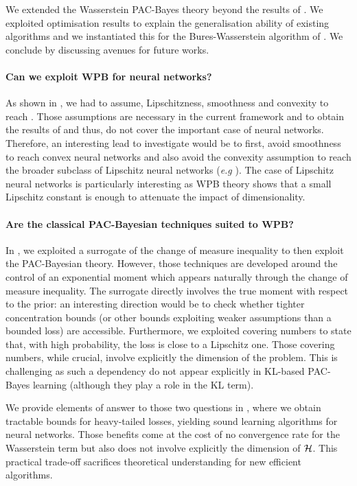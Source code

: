 We extended the Wasserstein PAC-Bayes theory beyond the results of \citet{amit2022integral}. We exploited optimisation results to explain the generalisation ability of existing algorithms and we instantiated this for the Bures-Wasserstein algorithm of \citet{lambert2022variational}. We conclude by discussing avenues for future works.

\paragraph{Can we exploit WPB for neural networks?} As shown in , we had to assume, Lipschitzness, smoothness and convexity to reach . Those assumptions are necessary in the current framework and to obtain the results of \citet{lambert2022variational} and thus, do not cover the important case of neural networks.
Therefore, an interesting lead to investigate would be to first, avoid smoothness to reach convex neural networks \citet{bengio2005convex} and also avoid the convexity assumption to reach the broader subclass of Lipschitz neural networks (\emph{e.g} \citealp{gouk2021regularisation}).
The case of Lipschitz neural networks is particularly interesting as WPB theory shows that a small Lipschitz constant is enough to attenuate the impact of dimensionality. 

\paragraph{Are the classical PAC-Bayesian techniques suited to WPB?} In , we exploited a surrogate of the change of measure inequality to then exploit the PAC-Bayesian theory. However, those techniques are developed around the control of an exponential moment which appears naturally through the change of measure inequality. The surrogate directly involves the true moment with respect to the prior: an interesting direction would be to check whether tighter concentration bounds (or other bounds exploiting weaker assumptions than a bounded loss) are accessible. Furthermore, we exploited covering numbers to state that, with high probability, the loss is close to a Lipschitz one. Those covering numbers, while crucial, involve explicitly the dimension of the problem. This is challenging as such a dependency do not appear explicitly in KL-based PAC-Bayes learning (although they play a role in the KL term). 

We provide elements of answer to those two questions in , where we obtain tractable bounds for heavy-tailed losses, yielding sound learning algorithms for neural networks. Those benefits come at the cost of no convergence rate for the Wasserstein term but also does not involve explicitly the dimension of $\mathcal{H}$. This practical trade-off sacrifices theoretical understanding for new efficient algorithms.



